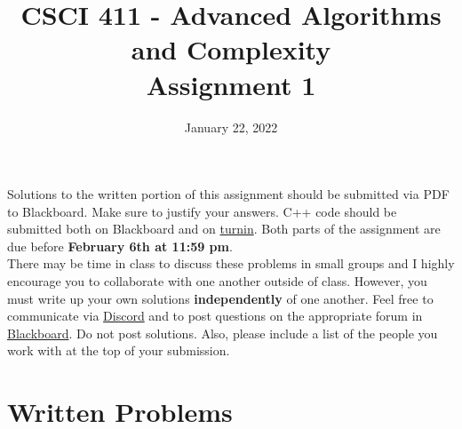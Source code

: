 \documentclass{article}
\title{CSCI 411 - Advanced Algorithms and Complexity \\ Assignment 1}
\author{ }
\date{January 22, 2022}
\begin{document}
\maketitle


\noindent Solutions to the written portion of this assignment should be submitted via PDF to Blackboard. Make sure to justify your answers. C++ code should be submitted both on Blackboard and on \href{https://turnin.ecst.csuchico.edu/}{turnin}. Both parts of the assignment are due before \textbf{February 6th at 11:59 pm}. \\

\noindent There may be time in class to discuss these problems in small groups and I highly encourage you to collaborate with one another outside of class. However, you must write up your own solutions \textbf{independently} of one another. Feel free to communicate via \href{https://discord.gg/XcZ3jzkBrx}{Discord} and to post questions on the appropriate forum in \href{https://learn.csuchico.edu/webapps/blackboard/content/listContentEditable.jsp?content_id=_6022500_1&course_id=_172426_1}{Blackboard}. Do not post solutions. Also, please include a list of the people you work with at the top of your submission. \\


\section*{Written Problems}
\end{document}
